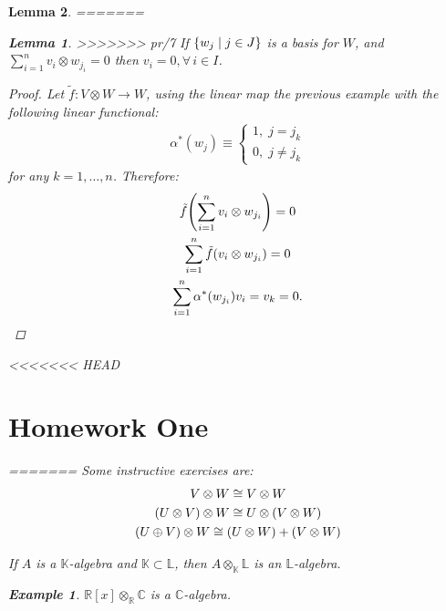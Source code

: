 \documentclass{article}
\newtheorem{Lemma}{Lemma}
\theoremstyle{definition}
\newtheorem*{Example*}{Example}
\theoremstyle{remark}
\theoremstyle{underline}
\theoremstyle{underline}
\begin{document}
	\begin{Lemma}\label{lem:tensProdBasis}
=======

		\begin{Lemma}\label{lem:tensProdBasis}
>>>>>>> pr/7
		If $\qty{w_j \mid j \in J}$ is a basis for $W$, and $ \sum\limits_{i=1}^n v_i \otimes w_{j_i} = 0 $	then $v_i = 0, \forall\,i \in I$.
	\end{Lemma}
	\begin{proof}
		Let $\tilde f \colon V \otimes W \to W$, using the linear map the previous example with the following linear functional:
		\begin{gather*}
			\alpha^*(w_j) \equiv \begin{cases}
        1, \; j = j_k \\
        0, \; j \neq j_k 
        \end{cases}
		\end{gather*}
		for any $k = 1, \ldots, n$. Therefore:
		\begin{gather*}
			\tilde f \pqty{\sum_{i=1}^n v_i \otimes w_{j_i}} = 0\\
			\sum_{i=1}^n \tilde f\pqty{v_i \otimes w_{j_i}} = 0 \\
			\sum_{i=1}^n \alpha^*\pqty{w_{j_i}} v_i = v_k = 0.
		\end{gather*}
	\end{proof}

<<<<<<< HEAD
	\section{Homework One}
	
=======
	Some instructive exercises are:
	\begin{gather*}
		V \otimes W \cong V \otimes W \\
		\pqty{U \otimes V} \otimes W \cong U \otimes \pqty{V \otimes W} \\
		\pqty{U \oplus V} \otimes W \cong \pqty{U \otimes W} + \pqty{V \otimes W} 
	\end{gather*}

	If $A$ is a $\mathbb K$-algebra and $\mathbb K \subset \mathbb L$, then $A \otimes_{\mathbb K} \mathbb L$ is an $\mathbb L$-algebra.

	\begin{Example*}
		$\mathbb R[x] \otimes_{\mathbb R} \mathbb C$ is a $\mathbb C$-algebra.
	\end{Example*}


\end{Lemma}
\end{document}
